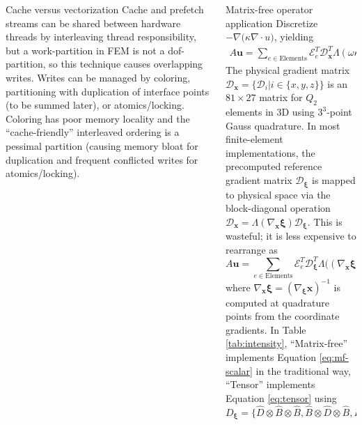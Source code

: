 \documentclass[final,t]{beamer}
\begin{document}
\begin{frame}{}
\begin{columns}
\begin{column}{0.48\textwidth}
\begin{block}{Cache versus vectorization}
        Cache and prefetch streams can be shared between hardware threads by interleaving thread responsibility, but a work-partition in FEM is not a dof-partition, so this technique causes overlapping writes.
        Writes can be managed by coloring, partitioning with duplication of interface points (to be summed later), or atomics/locking.
        Coloring has poor memory locality and the ``cache-friendly'' interleaved ordering is a pessimal partition (causing memory bloat for duplication and frequent conflicted writes for atomics/locking).
      \end{block}
    \end{column}
    \begin{column}{0.48\textwidth}
      \begin{block}{Matrix-free operator application}
        Discretize $-\nabla \Big(\kappa \nabla\cdot u\Big)$, yielding
        \begin{gather}\label{eq:mf-scalar}
          A \mathbf u = \sum_{e \in \text{Elements}} \mathcal E_e^T \mathcal D_{\mathbf x}^T \Lambda(\omega \kappa) \mathcal D_{\mathbf x} \mathcal E_e \mathbf u
        \end{gather}
        The physical gradient matrix $\mathcal D_{\mathbf x} = \{\mathcal D_i | i \in \{x,y,z\} \}$ is an $81\times 27$ matrix for $Q_2$ elements in 3D using $3^3$-point Gauss quadrature.
        In most finite-element implementations, the precomputed reference gradient matrix $\mathcal D_{\mathbf \xi}$ is mapped to physical space via the block-diagonal operation $\mathcal D_{\mathbf x} = \Lambda(\nabla_{\mathbf x}\mathbf\xi) \mathcal D_{\mathbf \xi}$.
        This is wasteful; it is less expensive to rearrange as
        \begin{equation}\label{eq:tensor}
          A \mathbf u = \sum_{e \in \text{Elements}} \mathcal E_e^T \mathcal D_{\mathbf \xi}^T \Lambda\Big((\nabla_{\mathbf x}\mathbf\xi)^T (\omega \kappa) (\nabla_{\mathbf x}\mathbf\xi) \Big) \mathcal D_{\mathbf \xi} \mathcal E_e \mathbf u .
        \end{equation}
        where $\nabla_{\mathbf x}\mathbf\xi = (\nabla_{\mathbf\xi}\mathbf x)^{-1}$ is computed at quadrature points from the coordinate gradients.
        In Table \ref{tab:intensity}, ``Matrix-free'' implements Equation \ref{eq:mf-scalar} in the traditional way, ``Tensor'' implements Equation \ref{eq:tensor} using
        \begin{equation}
          D_{\mathbf\xi} = \{\hat D \otimes \hat B \otimes \hat B, \hat B \otimes \hat D \otimes \hat B, \hat B \otimes \hat B \otimes \hat D \}

\end{equation}
\end{block}
\end{column}
\end{columns}
\end{frame}
\end{document}
